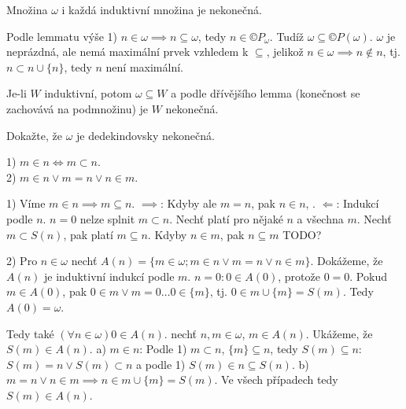 \documentclass[12pt]{article}                   %
\begin{document}

    \begin{lemma}
        Množina $\omega$ i každá induktivní množina je nekonečná.

        \begin{dukazin}
            Podle lemmatu výše 1) $n \in \omega \implies n \subseteq \omega$, tedy $n \in ©P_{\omega}$. Tudíž $\omega \subseteq ©P(\omega)$. $\omega$ je neprázdná, ale nemá maximální prvek vzhledem k $\subseteq$, jelikož $n \in \omega \implies n \notin n$, tj. $n \subset n \cup \{n\}$, tedy $n$ není maximální.

            Je-li $W$ induktivní, potom $\omega \subseteq W$ a podle dřívějšího lemma (konečnost se zachovává na podmnožinu) je $W$ nekonečná.
        \end{dukazin}
    \end{lemma}

    \begin{priklad}[Cvičení]
        Dokažte, že $\omega$ je dedekindovsky nekonečná.
    \end{priklad}

    \begin{lemma}
        1) $m \in n \Leftrightarrow m \subset n$.\\
        2) $m \in n \lor m = n \lor n \in m$.

        \begin{dukazin}
                1) Víme $m \in n \implies m \subseteq n$. $\implies$: Kdyby ale $m = n$, pak $n \in n$, \lightning. $\Leftarrow$: Indukcí podle $n$. $n = 0$ nelze splnit $m \subset n$. Nechť platí pro nějaké $n$ a všechna $m$. Nechť $m \subset S(n)$, pak platí $m \subseteq n$. Kdyby $n \in m$, pak $n \subseteq m$ TODO?

                2) Pro $n \in \omega$ nechť $A(n) = \{m \in \omega; m \in n \lor m = n \lor n \in m\}$. Dokážeme, že $A(n)$ je induktivní indukcí podle $m$. $n = 0: 0 \in A(0)$, protože $0 = 0$. Pokud $m \in A(0)$, pak $0 \in m \lor m = 0…0 \in \{m\}$, tj. $0 \in m \cup \{m\} = S(m)$. Tedy $A(0) = \omega$.

                Tedy také $(\forall n \in \omega) 0 \in A(n)$. nechť $n, m \in \omega$, $m \in A(n)$. Ukážeme, že $S(m) \in A(n)$. a) $m \in n$: Podle 1) $m \subset n$, $\{m\} \subseteq n$, tedy $S(m) \subseteq n$: $S(m) = n \lor S(m) \subset n$ a podle 1) $S(m) \in n \subseteq S(n)$. b) $m = n \lor n \in m \implies n \in m \cup \{m\} = S(m)$. Ve všech případech tedy $S(m) \in A(n)$.
        \end{dukazin}
    \end{lemma}
\end{document}
